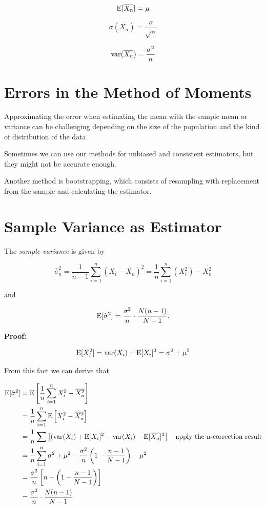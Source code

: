\[
    \mathrm{E}[\overline{X_n}] = \mu
\]

\[
    \sigma(\overline{X_n}) = \frac{\sigma}{\sqrt{n}}
\]

\[
    \mathrm{var}(\overline{X_n}) = \frac{\sigma^2}{n}
\]

\section{Errors in the Method of Moments}

Approximating the error when estimating the mean with the sample mean or variance can be challenging depending on the size of the population and the kind of distribution
of the data. 

Sometimes we can use our methods for unbiased and consistent estimators, but they might not be accurate enough. 

Another method is bootstrapping, which consists of resampling with replacement from the sample and calculating the estimator.

\section{Sample Variance as Estimator}

The \emph{sample variance} is given by 

\[
    \hat{\sigma}_n^2 = \frac{1}{n - 1} \sum_{i = 1}^{n} (X_i - \overline{X_n})^2 = \frac{1}{n} \sum_{i = 1}^{n} \left( X_i^2 \right) - \overline{X_n^2}
\]

and 

\[
    \mathrm{E}[\hat{\sigma}^2] = \frac{\sigma^2}{n} \cdot \frac{N(n - 1)}{N - 1}.
\]

\textbf{Proof:} 

\[
    \mathrm{E}[X_i^2] = \mathrm{var}(X_i) + \mathrm{E}[X_i]^2 = \sigma^2 + \mu^2
\]

From this fact we can derive that 

\begin{align*}
    \mathrm{E}[\hat{\sigma}^2] &= \mathrm{E}\left[\frac{1}{n} \sum_{i = 1}^{n} X_i^2 - \overline{X_n^2}\right] \\
    &= \frac{1}{n} \sum_{i = 1}^{n} \mathrm{E}\left[ X_i^2 - \overline{X_n^2} \right] \\
    &= \frac{1}{n} \sum \left[(\mathrm{var}(X_i) + \mathrm{E}[X_i]^2 - \mathrm{var}(X_i) - \mathrm{E}[\overline{X_n}]^2\right] \quad \text{apply the n-correction result} \\ 
    &= \frac{1}{n} \sum_{i = 1}^{n} \sigma^2 + \mu^2 - \frac{\sigma^2}{n}\left(1 - \frac{n - 1}{N - 1}\right) - \mu^2 \\ 
    &= \frac{\sigma^2}{n} \left[n - \left(1 - \frac{n - 1}{N - 1}\right)\right] \\ 
    &= \frac{\sigma^2}{n} \cdot \frac{N(n - 1)}{N - 1}
\end{align*}

